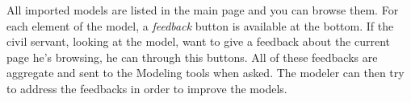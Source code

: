 \documentclass{learnpad}
\begin{document}
All imported models are listed in the main page and you can browse them.  For
each element of the model, a \emph{feedback} button is available at the bottom.
If the civil servant, looking at the model, want to give a feedback about the
current page he's browsing, he can through this buttons.  All of these feedbacks
are aggregate and sent to the Modeling tools when asked.  The modeler can then
try to address the feedbacks in order to improve the models.







%  
% 
\end{document}
